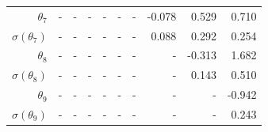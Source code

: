 \documentclass{matmex-diploma-custom}
\begin{document}
\begin{table}[h!!]
\begin{tabular}{r|rrrrrrrrr}
 $\theta_7$&-     &    - &    - &    - &    - &    - &  -0.078 &   0.529 &   0.710 \\
 $ \sigma(\theta_7)$&-     &    - &    - &    - &    - &    - &      0.088 &   0.292 &   0.254 \\
 $\theta_8$&-     &    - &    - &    - &    - &    - &    - &   -0.313 &   1.682 \\
 $ \sigma(\theta_8)$&-     &    - &    - &    - &    - &    - &    - &     0.143 &   0.510 \\
 $\theta_9$&-     &    - &    - &    - &    - &    - &    - &    - &  -0.942  \\
 $ \sigma(\theta_9)$&-     &    - &    - &    - &    - &    - &    - &    - &   0.243  \\
\end{tabular}
\end{table}
\end{document}
